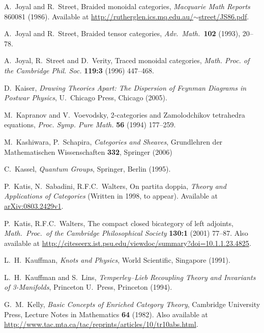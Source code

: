 \documentclass[12pt,twoside,openright]{report}
\begin{document}
\begin{thebibliography}{99}
 A.\ Joyal and R.\ Street, Braided monoidal categories,
{\sl Macquarie Math Reports} 860081 (1986).  Available at
\href{http://rutherglen.ics.mq.edu.au/~street/JS86.pdf}{
http://rutherglen.ics.mq.edu.au/$\sim$street/JS86.pdf}.

A.\ Joyal and R.\ Street, Braided tensor categories,
\textsl{Adv.\ Math.\ }\textbf{102} (1993), 20--78.

 A.\ Joyal, R.\ Street and D.\ Verity, Traced monoidal categories, \textsl{Math. Proc. of the Cambridge Phil. Soc.} \textbf{119:3} (1996) 447--468.

D.\ Kaiser, \textsl{Drawing Theories Apart: The Dispersion of Feynman Diagrams in Postwar Physics}, U.\ Chicago Press, Chicago (2005).

 M.\ Kapranov and V.\ Voevodsky, 2-categories and Zamolodchikov tetrahedra equations, \textsl{Proc. Symp. Pure Math.} \textbf{56} (1994) 177--259.

 M.\ Kashiwara, P.\ Schapira, \textsl{Categories and Sheaves}, Grundlehren der Mathematischen Wissenschaften \textbf{332}, Springer (2006)

 C.\ Kassel, \textsl{Quantum Groups}, Springer, Berlin (1995).

 P.\ Katis, N.\ Sabadini, R.F.C.\ Walters, On partita doppia, \textsl{Theory and Applications of Categories} (Written in 1998, to appear).  Available at \href{http://arxiv.org/abs/0803.2429}{arXiv:0803.2429v1}.

 P.\ Katis, R.F.C.\ Walters, The compact closed bicategory of left adjoints, \textsl{Math.\ Proc.\ of the Cambridge Philosophical Society} \textbf{130:1} (2001) 77--87.  Also available at \href{http://citeseerx.ist.psu.edu/viewdoc/summary?doi=10.1.1.23.4825}{http://citeseerx.ist.psu.edu/viewdoc/summary?doi=10.1.1.23.4825}.

L.\ H.\ Kauffman, {\sl Knots and Physics}, World Scientific, Singapore (1991).

L.\ H.\ Kauffman and S.\ Lins, {\sl Temperley--Lieb Recoupling Theory and Invariants of 3-Manifolds}, Princeton U.\ Press, Princeton (1994).

 G.\ M.\ Kelly, \textsl{Basic Concepts of Enriched Category Theory}, Cambridge University Press, Lecture Notes in Mathematics \textbf{64} (1982).  Also available at \href{http://www.tac.mta.ca/tac/reprints/articles/10/tr10abs.html}{http://www.tac.mta.ca/tac/reprints/articles/10/tr10abs.html}.


\end{thebibliography}
\end{document}
